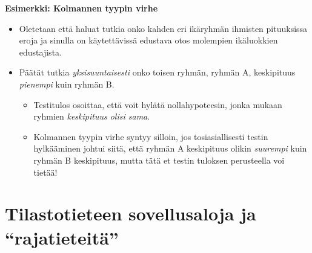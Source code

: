 \documentclass[
]{book}
\providecommand{\tightlist}{%
  \setlength{\itemsep}{0pt}\setlength{\parskip}{0pt}}
\begin{document}
\begin{eblock}{}

\textbf{Esimerkki: Kolmannen tyypin virhe}

\begin{itemize}
\tightlist
\item
  Oletetaan että haluat tutkia onko kahden eri ikäryhmän ihmisten pituuksissa eroja ja sinulla on käytettävissä edustava otos molempien ikäluokkien edustajista.
\item
  Päätät tutkia \emph{yksisuuntaisesti} onko toisen ryhmän, ryhmän A, keskipituus \emph{pienempi} kuin ryhmän B.

  \begin{itemize}
  \tightlist
  \item
    Testitulos osoittaa, että voit hylätä nollahypoteesin, jonka mukaan ryhmien \emph{keskipituus olisi sama}.
  \item
    Kolmannen tyypin virhe syntyy silloin, jos tosiasiallisesti testin hylkääminen johtui siitä, että ryhmän A keskipituus olikin \emph{suurempi} kuin ryhmän B keskipituus, mutta tätä et testin tuloksen perusteella voi tietää!\\
  \end{itemize}
\end{itemize}

\end{eblock}

\hypertarget{alaluku36}{%
\section{Tilastotieteen sovellusaloja ja ``rajatieteitä''}\label{alaluku36}}
\end{document}
